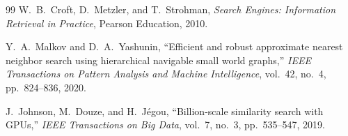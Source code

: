 \documentclass[11pt]{article}
\begin{document}
\begin{thebibliography}{99}
W.~B.~Croft, D.~Metzler, and T.~Strohman,
\emph{Search Engines: Information Retrieval in Practice},
Pearson Education, 2010.

Y.~A.~Malkov and D.~A.~Yashunin,
``Efficient and robust approximate nearest neighbor search using hierarchical navigable small world graphs,''
\emph{IEEE Transactions on Pattern Analysis and Machine Intelligence}, vol.~42, no.~4, pp.~824--836, 2020.

J.~Johnson, M.~Douze, and H.~J\'{e}gou,
``Billion-scale similarity search with GPUs,''
\emph{IEEE Transactions on Big Data}, vol.~7, no.~3, pp.~535--547, 2019.

\end{thebibliography}
\end{document}
